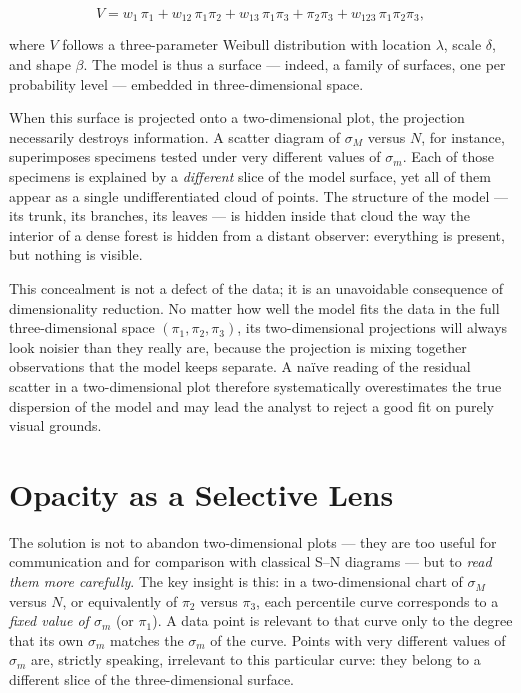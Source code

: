 \begin{equation}
  V = w_1\,\pi_1 + w_{12}\,\pi_1\pi_2 + w_{13}\,\pi_1\pi_3
      + \pi_2\pi_3 + w_{123}\,\pi_1\pi_2\pi_3,
  \label{eq:V}
\end{equation}

\noindent where $V$ follows a three-parameter Weibull distribution with location $\lambda$, scale $\delta$, and shape $\beta$. The model is thus a surface — indeed, a family of surfaces, one per probability level — embedded in three-dimensional space.

When this surface is projected onto a two-dimensional plot, the projection necessarily destroys information. A scatter diagram of $\sigma_M$ versus $N$, for instance, superimposes specimens tested under very different values of $\sigma_m$. Each of those specimens is explained by a \emph{different} slice of the model surface, yet all of them appear as a single undifferentiated cloud of points. The structure of the model — its trunk, its branches, its leaves — is hidden inside that cloud the way the interior of a dense forest is hidden from a distant observer: everything is present, but nothing is visible.

This concealment is not a defect of the data; it is an unavoidable consequence of dimensionality reduction. No matter how well the model fits the data in the full three-dimensional space $(\pi_1, \pi_2, \pi_3)$, its two-dimensional projections will always look noisier than they really are, because the projection is mixing together observations that the model keeps separate. A na\"ive reading of the residual scatter in a two-dimensional plot therefore systematically overestimates the true dispersion of the model and may lead the analyst to reject a good fit on purely visual grounds.

\section{Opacity as a Selective Lens}

The solution is not to abandon two-dimensional plots — they are too useful for communication and for comparison with classical S--N diagrams — but to \emph{read them more carefully}. The key insight is this: in a two-dimensional chart of $\sigma_M$ versus $N$, or equivalently of $\pi_2$ versus $\pi_3$, each percentile curve corresponds to a \emph{fixed value of $\sigma_m$} (or $\pi_1$). A data point is relevant to that curve only to the degree that its own $\sigma_m$ matches the $\sigma_m$ of the curve. Points with very different values of $\sigma_m$ are, strictly speaking, irrelevant to this particular curve: they belong to a different slice of the three-dimensional surface.

